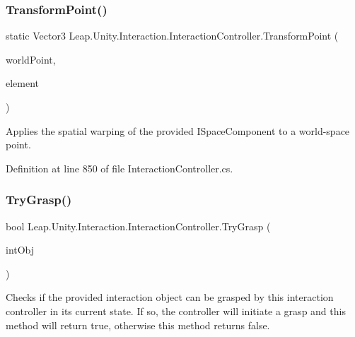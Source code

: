 \subsubsection{\texorpdfstring{TransformPoint()}{TransformPoint()}}
{\footnotesize\ttfamily static Vector3 Leap.\+Unity.\+Interaction.\+Interaction\+Controller.\+Transform\+Point (\begin{DoxyParamCaption}\item[{Vector3}]{world\+Point,  }\item[{\mbox{\hyperlink{interface_leap_1_1_unity_1_1_space_1_1_i_space_component}{I\+Space\+Component}}}]{element }\end{DoxyParamCaption})\hspace{0.3cm}{\ttfamily [static]}}



Applies the spatial warping of the provided I\+Space\+Component to a world-\/space point. 



Definition at line 850 of file Interaction\+Controller.\+cs.

\mbox{\label{class_leap_1_1_unity_1_1_interaction_1_1_interaction_controller_a45ba36ef191ab50b94feba99fcc8c05d}} 
\subsubsection{\texorpdfstring{TryGrasp()}{TryGrasp()}}
{\footnotesize\ttfamily bool Leap.\+Unity.\+Interaction.\+Interaction\+Controller.\+Try\+Grasp (\begin{DoxyParamCaption}\item[{\mbox{\hyperlink{interface_leap_1_1_unity_1_1_interaction_1_1_i_interaction_behaviour}{I\+Interaction\+Behaviour}}}]{int\+Obj }\end{DoxyParamCaption})}



Checks if the provided interaction object can be grasped by this interaction controller in its current state. If so, the controller will initiate a grasp and this method will return true, otherwise this method returns false. 



